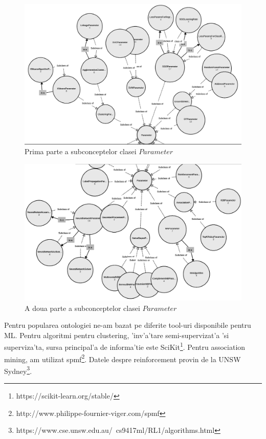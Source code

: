 \documentclass[12pt,a4paper,twoside]{report}
\begin{document}
\begin{figure}
    \centering
    \includegraphics[width = 0.9 \linewidth]{img/properties_subcls_2.png}
        \caption{Prima parte a subconceptelor clasei $Parameter$}
    \label{fig:subc_1}
\end{figure}

\begin{figure}
    \centering
    \includegraphics[width = 0.9 \linewidth]{img/properties_subcls_1.png}
        \caption{A doua parte a subconceptelor clasei $Parameter$}
    \label{fig:subc_2}
\end{figure}

Pentru popularea ontologiei ne-am bazat pe diferite tool-uri disponibile pentru ML. Pentru algoritmi pentru clustering, 'inv'a'tare semi-supervizat'a 'si superviza'ta, sursa principal'a de informa'tie este SciKit\footnote{https://scikit-learn.org/stable/}. Pentru association mining, am utilizat spmf\footnote{http://www.philippe-fournier-viger.com/spmf}. Datele despre reinforcement provin de la UNSW Sydney\footnote{https://www.cse.unsw.edu.au/~cs9417ml/RL1/algorithms.html}. 
\end{document}
